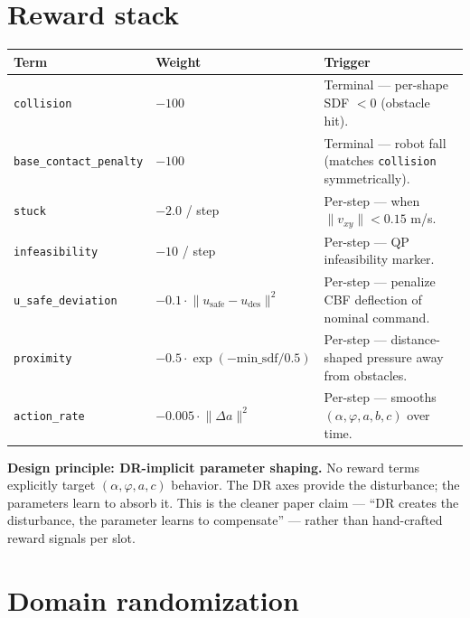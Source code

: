 \documentclass[11pt]{article}
\begin{document}
\section{Reward stack}

\begin{small}
\begin{tabularx}{\linewidth}{@{}llX@{}}
\toprule
Term                            & Weight                                                       & Trigger \\
\midrule
\texttt{collision}              & $-100$                                                       & Terminal --- per-shape SDF $< 0$ (obstacle hit). \\
\texttt{base\_contact\_penalty} & $-100$                                                       & Terminal --- robot fall (matches \texttt{collision} symmetrically). \\
\texttt{stuck}                  & $-2.0$ / step                                                & Per-step --- when $\lVert v_{xy}\rVert < 0.15$ m/s. \\
\texttt{infeasibility}          & $-10$ / step                                                 & Per-step --- QP infeasibility marker. \\
\texttt{u\_safe\_deviation}     & $-0.1\cdot\lVert u_{\text{safe}}-u_{\text{des}}\rVert^{2}$   & Per-step --- penalize CBF deflection of nominal command. \\
\texttt{proximity}              & $-0.5\cdot\exp(-\text{min\_sdf}/0.5)$                        & Per-step --- distance-shaped pressure away from obstacles. \\
\texttt{action\_rate}           & $-0.005\cdot\lVert\Delta a\rVert^{2}$                        & Per-step --- smooths $(\alpha,\varphi,a,b,c)$ over time. \\
\bottomrule
\end{tabularx}
\end{small}

\noindent
\textbf{Design principle: DR-implicit parameter shaping.} No reward terms
explicitly target $(\alpha, \varphi, a, c)$ behavior. The DR axes provide the
disturbance; the parameters learn to absorb it. This is the cleaner paper
claim --- ``DR creates the disturbance, the parameter learns to compensate'' ---
rather than hand-crafted reward signals per slot.

\section{Domain randomization}
\end{document}
